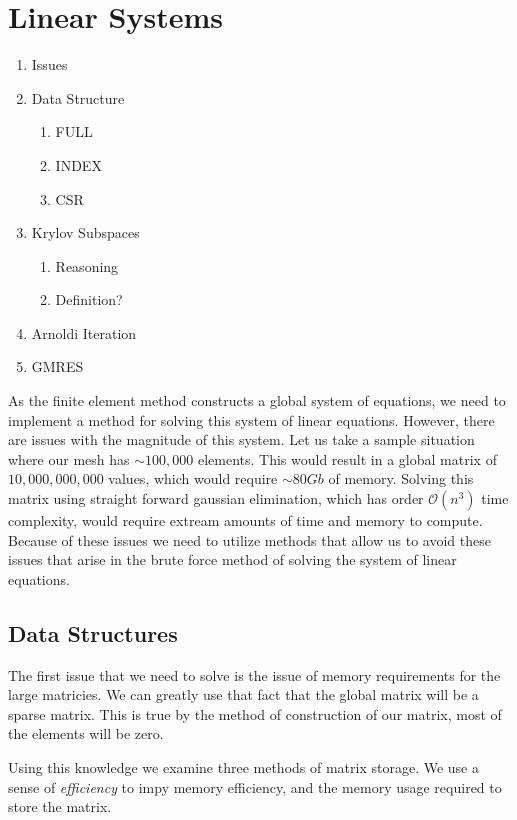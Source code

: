 \documentclass[../fem.tex]{subfiles}
\begin{document}
\section{Linear Systems}%
\label{sec:linear_systems}

\begin{enumerate}
  \item Issues
  \item Data Structure
    \begin{enumerate}
      \item FULL
      \item INDEX
      \item CSR
    \end{enumerate}
  \item Krylov Subspaces
    \begin{enumerate}
      \item Reasoning
      \item Definition?
    \end{enumerate}
  \item Arnoldi Iteration
  \item GMRES
\end{enumerate}

As the finite element method constructs a global system of equations, we need
to implement a method for solving this system of linear equations. However,
there are issues with the magnitude of this system. Let us take a sample
situation where our mesh has $\sim 100,000$ elements. This would result in a
global matrix of $10,000,000,000$ values, which would require $\sim 80Gb$ of
memory. Solving this matrix using straight forward gaussian elimination, which
has order $\mathcal{O}(n^3)$ time complexity, would require extream amounts of
time and memory to compute. Because of these issues we need to utilize methods
that allow us to avoid these issues that arise in the brute force method of
solving the system of linear equations.

\subsection{Data Structures}%
\label{sub:data_structures}

The first issue that we need to solve is the issue of memory requirements for
the large matricies. We can greatly use that fact that the global matrix will
be a sparse matrix. This is true by the method of construction of our matrix,
most of the elements will be zero.

Using this knowledge we examine three methods of matrix storage. We use a sense
of \textit{efficiency} to impy memory efficiency, and the memory usage required
to store the matrix.
\end{document}
